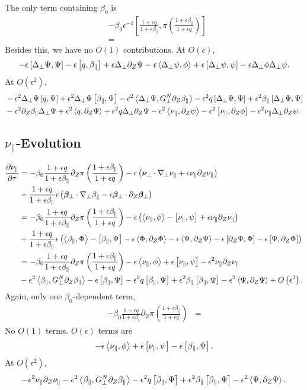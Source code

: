 \documentclass{article}
\newcommand{\para}{\parallel}
\newcommand{\ep}{\epsilon}
\newcommand{\np}{\nabla_\perp}
\newcommand{\lap}{\Delta_\perp}
\newcommand{\p}{\partial}
\newcommand{\deriv}[2]{\frac{\p #1}{\p #2}}
\newcommand{\fr}{\frac{1+\ep q}{1+\ep\beta_\para}}
\newcommand{\frinv}{\frac{1+\ep\beta_\para}{1+\ep q}}
\newcommand{\GN}{G_\perp^N}
\newcommand{\pth} [1] {\left( #1 \right) }
\newcommand{\br} [1] {\left[ #1 \right] }
\begin{document}
The only term containing $\beta_0$ is
\begin{align*}
    &- \beta_0\ep^{-1}\br{\fr, \pi\pth{\frinv}} \\
    &= 
\end{align*}
Besides this, we have no $O(1)$ contributions. At $O(\ep)$, 
\begin{align*}
    - \ep\br{\lap\Psi, \Psi} - \ep\br{q, \beta_\para} + \ep\lap\p_Z\Psi - \ep\Braket{\lap\psi, \phi} + \ep\br{\lap\psi, \psi} - \ep\lap\phi\lap\psi.
\end{align*}
At $O(\ep^2)$, 
\begin{align*}
    &- \ep^2\lap\Psi\br{q,\Psi} + \ep^2\lap\Psi\br{\beta_\para,\Psi} - \ep^2\Braket{\lap\Psi, \GN\p_Z\beta_\para} - \ep^2q\br{\lap\Psi, \Psi} + \ep^2\beta_\para\br{\lap\Psi, \Psi} \\
    &- \ep^2\p_Z\beta_\para\lap\Psi + \ep^2\Braket{q, \p_Z\Psi} + \ep^2q\lap\p_Z\Psi - \ep^2\Braket{\nu_\para, \p_Z\psi} - \ep^2\br{\nu_\para, \p_Z\phi} - \ep^2\nu_\para\lap\p_Z\psi.
\end{align*}


\subsection{$\nu_\para$-Evolution}
\begin{align*}
    \deriv{\nu_\para}{\tau} &= - \beta_0\fr\p_Z\pi\pth{\frinv} - \ep\pth{\bm{\nu}_\perp\cdot\np\nu_\para + \ep \nu_\para\p_Z\nu_\para} \\
    &+ \fr\ep\pth{\bm{\beta}_\perp\cdot\np\beta_\para - \ep\bm{\beta}_\perp\cdot\p_Z\bm{\beta}_\perp} \\
    &= - \beta_0\fr\p_Z\pi\pth{\frinv} - \ep\pth{\Braket{\nu_\para, \phi} - \br{\nu_\para, \psi} + \ep\nu_\para\p_Z\nu_\para} \\
    &+ \fr\ep\pth{\Braket{\beta_\para, \Phi} - \br{\beta_\para, \Psi} - \ep\Braket{\Phi, \p_Z\Phi} - \ep\Braket{\Psi, \p_Z\Psi} - \ep\br{\p_Z\Psi, \Phi} - \ep\br{\Psi, \p_Z\Phi}} \\
    &= - \beta_0\fr\p_Z\pi\pth{\frinv} - \ep\Braket{\nu_\para, \phi} + \ep\br{\nu_\para, \psi} - \ep^2\nu_\para\p_Z\nu_\para \\
    &-\ep^2\Braket{\beta_\para, \GN\p_Z\beta_\para} - \ep\br{\beta_\para, \Psi} - \ep^2q\br{\beta_\para, \Psi} + \ep^2\beta_\para\br{\beta_\para,\Psi} - \ep^2\Braket{\Psi, \p_Z\Psi} + O\pth{\ep^3}.
\end{align*}
Again, only one $\beta_0$-dependent term, 
\begin{align*}
    - \beta_0\fr\p_Z\pi\pth{\frinv} &= 
\end{align*}
No $O(1)$ terms. $O(\ep)$ terms are 
\begin{align*}
    - \ep\Braket{\nu_\para, \phi} + \ep\br{\nu_\para, \psi} - \ep\br{\beta_\para, \Psi}.
\end{align*}
At $O(\ep^2)$, 
\begin{align*}
    - \ep^2\nu_\para\p_Z\nu_\para - \ep^2\Braket{\beta_\para, \GN\p_Z\beta_\para} - \ep^2q\br{\beta_\para, \Psi} + \ep^2\beta_\para\br{\beta_\para,\Psi} - \ep^2\Braket{\Psi, \p_Z\Psi}.
\end{align*}
\end{document}
